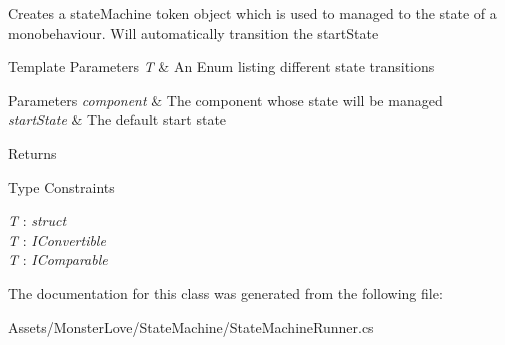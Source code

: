 Creates a state\+Machine token object which is used to managed to the state of a monobehaviour. Will automatically transition the start\+State 


\begin{DoxyTemplParams}{Template Parameters}
{\em T} & An Enum listing different state transitions\\
\hline
\end{DoxyTemplParams}

\begin{DoxyParams}{Parameters}
{\em component} & The component whose state will be managed\\
\hline
{\em start\+State} & The default start state\\
\hline
\end{DoxyParams}
\begin{DoxyReturn}{Returns}

\end{DoxyReturn}
\begin{Desc}
\item[Type Constraints]\begin{description}
\item[{\em T} : {\em struct}]\item[{\em T} : {\em I\+Convertible}]\item[{\em T} : {\em I\+Comparable}]\end{description}
\end{Desc}


The documentation for this class was generated from the following file\+:\begin{DoxyCompactItemize}
\item 
Assets/\+Monster\+Love/\+State\+Machine/State\+Machine\+Runner.\+cs\end{DoxyCompactItemize}
